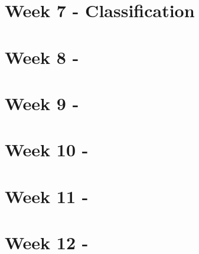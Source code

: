 \documentclass[8pt]{article}
\begin{document}
\newpage
\section{Week 7 - Classification}

\section{Week 8 - }
\section{Week 9 - }
\section{Week 10 - }
\section{Week 11 - }
\section{Week 12 - }
\end{document}
